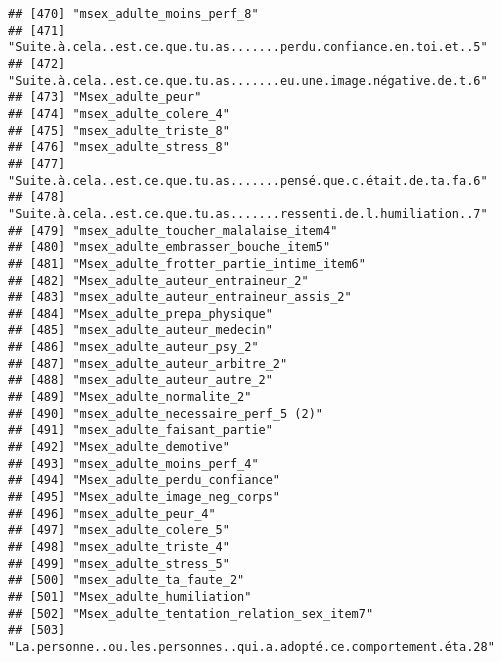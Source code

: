 \documentclass[
]{article}
\begin{document}
\begin{verbatim}
## [470] "msex_adulte_moins_perf_8"                                          
## [471] "Suite.à.cela..est.ce.que.tu.as.......perdu.confiance.en.toi.et..5" 
## [472] "Suite.à.cela..est.ce.que.tu.as.......eu.une.image.négative.de.t.6" 
## [473] "Msex_adulte_peur"                                                  
## [474] "msex_adulte_colere_4"                                              
## [475] "msex_adulte_triste_8"                                              
## [476] "msex_adulte_stress_8"                                              
## [477] "Suite.à.cela..est.ce.que.tu.as.......pensé.que.c.était.de.ta.fa.6" 
## [478] "Suite.à.cela..est.ce.que.tu.as.......ressenti.de.l.humiliation..7" 
## [479] "msex_adulte_toucher_malalaise_item4"                               
## [480] "msex_adulte_embrasser_bouche_item5"                                
## [481] "Msex_adulte_frotter_partie_intime_item6"                           
## [482] "Msex_adulte_auteur_entraineur_2"                                   
## [483] "msex_adulte_auteur_entraineur_assis_2"                             
## [484] "Msex_adulte_prepa_physique"                                        
## [485] "msex_adulte_auteur_medecin"                                        
## [486] "msex_adulte_auteur_psy_2"                                          
## [487] "msex_adulte_auteur_arbitre_2"                                      
## [488] "msex_adulte_auteur_autre_2"                                        
## [489] "Msex_adulte_normalite_2"                                           
## [490] "msex_adulte_necessaire_perf_5 (2)"                                 
## [491] "msex_adulte_faisant_partie"                                        
## [492] "Msex_adulte_demotive"                                              
## [493] "msex_adulte_moins_perf_4"                                          
## [494] "Msex_adulte_perdu_confiance"                                       
## [495] "Msex_adulte_image_neg_corps"                                       
## [496] "msex_adulte_peur_4"                                                
## [497] "msex_adulte_colere_5"                                              
## [498] "msex_adulte_triste_4"                                              
## [499] "msex_adulte_stress_5"                                              
## [500] "msex_adulte_ta_faute_2"                                            
## [501] "Msex_adulte_humiliation"                                           
## [502] "Msex_adulte_tentation_relation_sex_item7"                          
## [503] "La.personne..ou.les.personnes..qui.a.adopté.ce.comportement.éta.28"

\end{verbatim}
\end{document}
